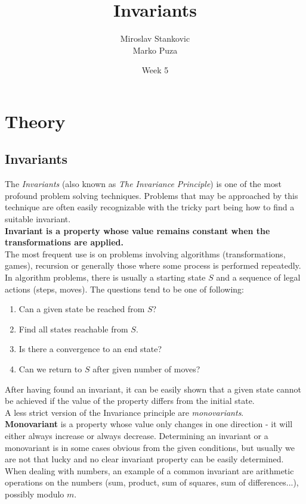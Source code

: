 \documentclass[11pt,a5paper]{article}
\title{\textbf{Invariants}}
\date{Week 5}
\author{Miroslav Stankovic\\ Marko Puza}
\begin{document}
\maketitle

\section{Theory}
\subsection*{Invariants}

The \emph{Invariants} (also known as \emph{The Invariance Principle}) is one of the most profound problem solving techniques. Problems that may be approached by this technique are often easily recognizable with the tricky part being how to find a suitable invariant.\\ 

\noindent\textbf{Invariant is a property whose value remains constant when the transformations are applied.}\\

\noindent The most frequent use is on problems involving algorithms (transformations, games), recursion or generally those where some process is performed repeatedly. In algorithm problems, there is usually a starting state $S$ and a sequence of legal actions (steps, moves). The questions tend to be one of following: 
\begin{enumerate}
\item {Can a given state be reached from $S$?}
\item {Find all states reachable from $S$.}
\item {Is there a convergence to an end state?}
\item {Can we return to $S$ after given number of moves?}
\end{enumerate}

\noindent After having found an invariant, it can be easily shown that a given state cannot be achieved if the value of the property differs from the initial state. \\

\noindent A less strict version of the Invariance principle are \emph{monovariants}. \\\textbf{Monovariant} is a property whose value only changes in one direction - it will either always increase or always decrease. Determining an invariant or a monovariant is in some cases obvious from the given conditions, but usually we are not that lucky and no clear invariant property can be easily determined. When dealing with numbers, an example of a common invariant are arithmetic operations on the numbers (sum, product, sum of squares, sum of differences...), possibly modulo $m$.\\
\end{document}
